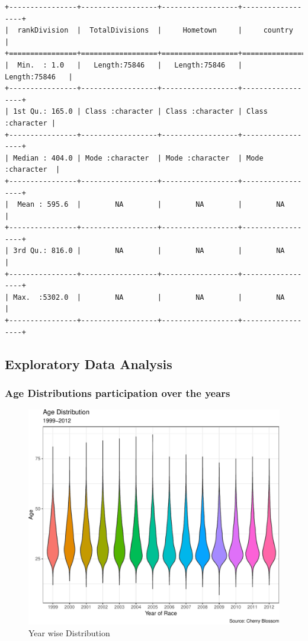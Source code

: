 \documentclass[
]{article}
\begin{document}
\begin{verbatim}
+----------------+------------------+------------------+------------------+
|  rankDivision  |  TotalDivisions  |     Hometown     |     country      |
+================+==================+==================+==================+
|  Min.  : 1.0   |   Length:75846   |   Length:75846   |   Length:75846   |
+----------------+------------------+------------------+------------------+
| 1st Qu.: 165.0 | Class :character | Class :character | Class :character |
+----------------+------------------+------------------+------------------+
| Median : 404.0 | Mode :character  | Mode :character  | Mode :character  |
+----------------+------------------+------------------+------------------+
|  Mean : 595.6  |        NA        |        NA        |        NA        |
+----------------+------------------+------------------+------------------+
| 3rd Qu.: 816.0 |        NA        |        NA        |        NA        |
+----------------+------------------+------------------+------------------+
| Max.  :5302.0  |        NA        |        NA        |        NA        |
+----------------+------------------+------------------+------------------+
\end{verbatim}

\newpage

\hypertarget{exploratory-data-analysis}{%
\subsection{Exploratory Data Analysis}\label{exploratory-data-analysis}}

\hypertarget{age-distributions-participation-over-the-years}{%
\subsubsection{Age Distributions participation over the
years}\label{age-distributions-participation-over-the-years}}

\begin{figure}[H]

\includegraphics[width=.49\linewidth,]{case_study02_SO02_files/figure-latex/unnamed-chunk-12-1} \hfill{}

\caption{Year wise Distribution}\label{fig:unnamed-chunk-12}
\end{figure}
\end{document}
